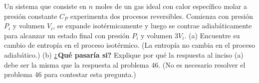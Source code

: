 \item Un sistema que consiste en $n$ moles de un gas ideal con calor específico molar a presión constante $C_P$ experimenta dos procesos reversibles. Comienza con presión $P_i$ y volumen $V_i$, se expande isotérmicamente y luego se contrae adiabáticamente para alcanzar un estado final con presión $P_i$ y volumen $3V_i$. (a) Encuentre su cambio de entropía en el proceso isotérmico. (La entropía no cambia en el proceso adiabático.) (b) \textbf{¿Qué pasaría si?} Explique por qué la respuesta al inciso (a) debe ser la misma que la respuesta al problema 46. (No es necesario resolver el problema 46 para contestar esta pregunta.)

